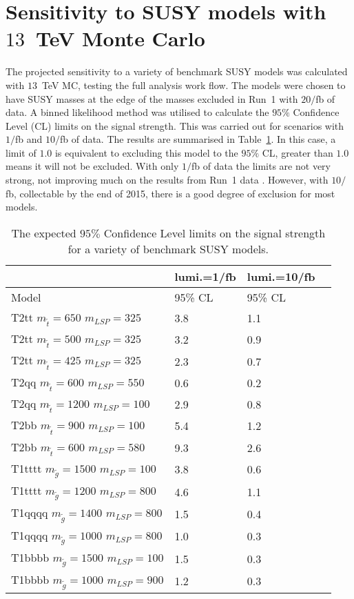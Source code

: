 
\section{Sensitivity to SUSY models with \boldmath $13$~TeV Monte Carlo}
\label{sec:phys14Results}

The projected sensitivity to a variety of benchmark SUSY models was calculated with $13$~TeV MC, testing the full analysis work flow. The models were chosen to have SUSY masses at the edge of the masses excluded in Run~1 with $20/$fb of data. A binned likelihood method was utilised to calculate the $95\%$ Confidence Level (CL) limits on the signal strength. This was carried out for scenarios with $1/$fb and $10/$fb of data. The results are summarised in Table~\ref{tab:results}. In this case, a limit of $1.0$ is equivalent to excluding this model to the $95\%$ CL, greater than $1.0$ means it will not be excluded. With only $1/$fb of data the limits are not very strong, not improving much on the results from Run~1 data \cite{susyRun1Twiki}. However, with $10/$fb, collectable by the end of 2015, there is a good degree of exclusion for most models.
 
\begin{table}[h]
\caption{The expected $95\%$ Confidence Level limits on the signal strength for a variety of benchmark SUSY models. \label{tab:results}}
\centering 
\begin{tabular}{ | l | l | l | }
\hline
	&lumi.=1/fb & lumi.=10/fb  \  \\ \hline
	Model & 95\% CL & 95\% CL \\ \hline
	T2tt $m_{\tilde{t}}=650$ $m_{LSP}=325$ & 3.8 & 1.1 \\ 
	T2tt $m_{\tilde{t}}=500$ $m_{LSP}=325$ & 3.2 & 0.9 \\ 
	T2tt $m_{\tilde{t}}=425$ $m_{LSP}=325$ & 2.3 & 0.7 \\ 
	T2qq $m_{\tilde{t}}=600$ $m_{LSP}=550$ & 0.6 & 0.2 \\ 
	T2qq $m_{\tilde{t}}=1200$ $m_{LSP}=100$ & 2.9 & 0.8 \\ 
	T2bb $m_{\tilde{t}}=900$ $m_{LSP}=100$ & 5.4 & 1.2 \\ 
	T2bb $m_{\tilde{t}}=600$ $m_{LSP}=580$ & 9.3 & 2.6 \\ 
	T1tttt $m_{\tilde{g}}=1500$ $m_{LSP}=100$ & 3.8 & 0.6 \\ 
	T1tttt $m_{\tilde{g}}=1200$ $m_{LSP}=800$ & 4.6 & 1.1 \\ 
	T1qqqq $m_{\tilde{g}}=1400$ $m_{LSP}=800$ & 1.5 & 0.4 \\ 
	T1qqqq $m_{\tilde{g}}=1000$ $m_{LSP}=800$ & 1.0 & 0.3 \\ 
	T1bbbb $m_{\tilde{g}}=1500$ $m_{LSP}=100$ & 1.5 & 0.3 \\ 
	T1bbbb $m_{\tilde{g}}=1000$ $m_{LSP}=900$ & 1.2 & 0.3 \\ \hline
\end{tabular}
\end{table}